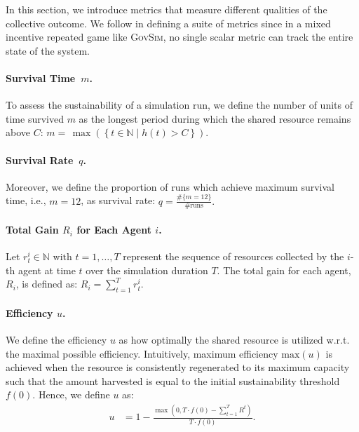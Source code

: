 \documentclass{article}
\newcommand{\envAbbr}{\textsc{GovSim}\xspace}
\newcommand{\totalPayoff}{R}
\newcommand{\sharedResource}{h}
\newcommand{\survivalTime}{m}
\newcommand{\survivalTimeName}{Survival Time\xspace}
\newcommand{\survivalRate}{q}
\newcommand{\survivalRateName}{Survival Rate\xspace}
\newcommand{\efficiency}{u}
\newcommand{\suistainablethreshold}{f}
\begin{document}
In this section, we introduce metrics that measure different qualities of the collective outcome. We follow \citet{perolat2017multi} in defining a suite of metrics since in a mixed incentive repeated game like \envAbbr, no single scalar metric can track the entire state of the system. 
%

\paragraph{\survivalTimeName~$\survivalTime$.}
To assess the sustainability of a simulation run, we define the number of units of time survived $\survivalTime$ as the longest period during which the shared resource remains above $C$:
$
      \survivalTime  = \,\max \left( \left\{  t\in \mathbb{N} \mid \sharedResource(t) > C   \right\} \right).
$

\paragraph{\survivalRateName~$\survivalRate$.}
Moreover, we define the proportion of runs which achieve maximum survival time, i.e., $\survivalTime = 12$, as survival rate:
$
\survivalRate = \frac{\#\{\survivalTime = 12\}}{\#\text{runs}}.
$

\paragraph{Total Gain ${\totalPayoff_i}$ for Each Agent $i$.}
Let ${r_t^i \in \mathbb{N} \text{ with } t=1, \ldots, T}$ represent the sequence of resources collected by the $i$-th agent at time $t$ over the simulation duration $T$. The total gain for each agent, $\totalPayoff_i$, is defined as:
$
 \totalPayoff_i = \sum_{t=1}^T r_t^i
$.


\paragraph{Efficiency ${\efficiency}$.}
We define the efficiency $\efficiency$ as how optimally the shared resource is utilized w.r.t. the maximal possible efficiency.
Intuitively, maximum efficiency $\mathrm{max}(u)$ is achieved when the resource is consistently regenerated to its maximum capacity such that the amount harvested is equal to the initial sustainability threshold $\suistainablethreshold(0)$. Hence, we define $u$ as:
\begin{align}
\efficiency& = 1 - \frac{\max \left(0, T \cdot \suistainablethreshold(0)- \sum_{t=1}^T \totalPayoff^t \right)}{T \cdot \suistainablethreshold(0)}.
\label{eq:efficiency}
\end{align}
\end{document}

